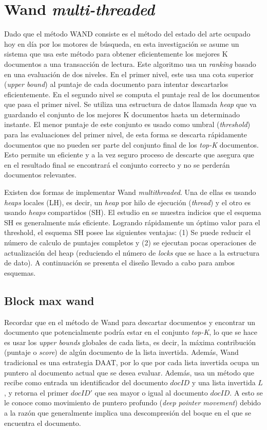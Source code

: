 \section{Wand \textit{multi-threaded}}
\label{scheduling:wm}
Dado que el método WAND \citep{Broder:2003} consiste es el método del estado del arte ocupado hoy en día por los motores de búsqueda, en esta investigación se asume un sistema que usa este método para obtener eficientemente los mejores K documentos a una transacción de lectura. Este algoritmo usa un \textit{ranking} basado en una evaluación de dos niveles. En el primer nivel, este usa una cota superior (\textit{upper bound}) al puntaje de cada documento para intentar descartarlos eficientemente. En el segundo nivel se computa el puntaje real de los documentos que pasa el primer nivel. Se utiliza una estructura de datos llamada \textit{heap} que va guardando el conjunto de los mejores K documentos hasta un determinado instante. El menor puntaje de este conjunto es usado como umbral (\textit{threshold}) para las evaluaciones del primer nivel, de esta forma se descarta rápidamente documentos que no pueden ser parte del conjunto final de los \textit{top-K} documentos. Esto permite un eficiente y a la vez seguro proceso de descarte que asegura que en el resultado final se encontrará el conjunto correcto y no se perderán documentos relevantes.

Existen dos formas de implementar Wand \textit{multithreaded}. Una de ellas es usando \textit{heaps} locales (LH), es decir, un \textit{heap} por hilo de ejecución (\textit{thread}) y el otro es usando \textit{heaps} compartidos (SH). El estudio en \citep{Rojas:2013} se muestra indicios que el esquema SH es generalmente más eficiente. Logrando rápidamente un óptimo valor para el threshold, el esquema SH posee las siguientes ventajas: (1) Se puede reducir el número de calculo de puntajes completos y (2) se ejecutan pocas operaciones de actualización del heap (reduciendo el número de \textit{locks} que se hace a la estructura de dato). A continuación se presenta el diseño llevado a cabo para ambos esquemas.

\subsection{Block max wand}
Recordar que en el método de Wand para descartar documentos y encontrar un documento que potencialmente podría estar en el conjunto \textit{top-K}, lo que se hace es usar los \textit{upper bounds} globales de cada lista, es decir, la máxima contribución (puntaje o \textit{score}) de algún documento de la lista invertida. Además, Wand tradicional es una estrategia DAAT, por lo que por cada lista invertida ocupa un puntero al documento actual que se desea evaluar. Además, usa un método que recibe como entrada un identificador del documento $docID$ y una lista invertida $L$, y retorna el primer $docID'$ que sea mayor o igual al documento $docID$. A esto se le conoce como movimiento de puntero profundo (\textit{deep pointer movement}) debido a la razón que generalmente implica una descompresión del boque en el que se encuentra el documento.


